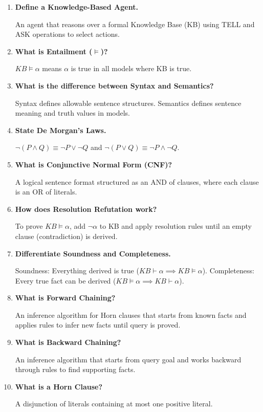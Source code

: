 \documentclass[12pt,a4paper]{article}
\newcommand{\Q}[1]{\textbf{#1}\par\noindent\ignorespaces}
\begin{document}
\begin{tcolorbox}[exambox, title={\textbf{Frequently Asked / Viva Questions}}]
  \begin{enumerate}[topsep=0pt, label=\textbf{Q\arabic*.}, itemsep=5pt]
    \item \Q{Define a Knowledge-Based Agent.}
    An agent that reasons over a formal Knowledge Base (KB) using TELL and ASK operations to select actions.

    \item \Q{What is Entailment ($\models$)?}
    $KB \models \alpha$ means $\alpha$ is true in all models where KB is true.

    \item \Q{What is the difference between Syntax and Semantics?}
    Syntax defines allowable sentence structures. Semantics defines sentence meaning and truth values in models.

    \item \Q{State De Morgan's Laws.}
    $\neg(P \land Q) \equiv \neg P \lor \neg Q$ and $\neg(P \lor Q) \equiv \neg P \land \neg Q$.

    \item \Q{What is Conjunctive Normal Form (CNF)?}
    A logical sentence format structured as an AND of clauses, where each clause is an OR of literals.

    \item \Q{How does Resolution Refutation work?}
    To prove $KB \models \alpha$, add $\neg \alpha$ to KB and apply resolution rules until an empty clause (contradiction) is derived.

    \item \Q{Differentiate Soundness and Completeness.}
    Soundness: Everything derived is true ($KB \vdash \alpha \implies KB \models \alpha$). Completeness: Every true fact can be derived ($KB \models \alpha \implies KB \vdash \alpha$).

    \item \Q{What is Forward Chaining?}
    An inference algorithm for Horn clauses that starts from known facts and applies rules to infer new facts until query is proved.

    \item \Q{What is Backward Chaining?}
    An inference algorithm that starts from query goal and works backward through rules to find supporting facts.

    \item \Q{What is a Horn Clause?}
    A disjunction of literals containing at most one positive literal.
  \end{enumerate}
\end{tcolorbox}
\end{document}
